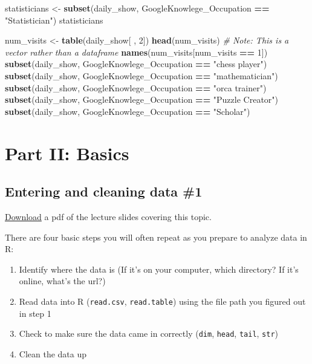 \documentclass[]{book}
\makeatletter
\newenvironment{Shaded}{\begin{snugshade}}{\end{snugshade}}
\newcommand{\KeywordTok}[1]{\textcolor[rgb]{0.13,0.29,0.53}{\textbf{#1}}}
\newcommand{\DecValTok}[1]{\textcolor[rgb]{0.00,0.00,0.81}{#1}}
\newcommand{\StringTok}[1]{\textcolor[rgb]{0.31,0.60,0.02}{#1}}
\newcommand{\CommentTok}[1]{\textcolor[rgb]{0.56,0.35,0.01}{\textit{#1}}}
\newcommand{\OperatorTok}[1]{\textcolor[rgb]{0.81,0.36,0.00}{\textbf{#1}}}
\newcommand{\NormalTok}[1]{#1}
\providecommand{\tightlist}{%
  \setlength{\itemsep}{0pt}\setlength{\parskip}{0pt}}
\newenvironment{kframe}{%
\medskip{}
\setlength{\fboxsep}{.8em}
 \def\at@end@of@kframe{}%
 \ifinner\ifhmode%
  \def\at@end@of@kframe{\end{minipage}}%
  \begin{minipage}{\columnwidth}%
 \fi\fi%
 \def\FrameCommand##1{\hskip\@totalleftmargin \hskip-\fboxsep
 \colorbox{shadecolor}{##1}\hskip-\fboxsep
     \hskip-\linewidth \hskip-\@totalleftmargin \hskip\columnwidth}%
 \MakeFramed {\advance\hsize-\width
   \@totalleftmargin\z@ \linewidth\hsize
   \@setminipage}}%
 {\par\unskip\endMakeFramed%
 \at@end@of@kframe}
\renewenvironment{Shaded}{\begin{kframe}}{\end{kframe}}
\theoremstyle{definition}
\theoremstyle{definition}
\theoremstyle{definition}
\theoremstyle{remark}
\makeatother
\begin{document}
\begin{Shaded}
\begin{Highlighting}[]
\NormalTok{statisticians <-}\StringTok{ }\KeywordTok{subset}\NormalTok{(daily_show,}
\NormalTok{                        GoogleKnowlege_Occupation }\OperatorTok{==}\StringTok{ "Statistician"}\NormalTok{)}
\NormalTok{statisticians}
\end{Highlighting}
\end{Shaded}

\begin{Shaded}
\begin{Highlighting}[]
\NormalTok{num_visits <-}\StringTok{ }\KeywordTok{table}\NormalTok{(daily_show[ , }\DecValTok{2}\NormalTok{])}
\KeywordTok{head}\NormalTok{(num_visits) }\CommentTok{# Note: This is a vector rather than a dataframe}
\KeywordTok{names}\NormalTok{(num_visits[num_visits }\OperatorTok{==}\StringTok{ }\DecValTok{1}\NormalTok{])}
\KeywordTok{subset}\NormalTok{(daily_show, GoogleKnowlege_Occupation }\OperatorTok{==}\StringTok{ "chess player"}\NormalTok{)}
\KeywordTok{subset}\NormalTok{(daily_show, GoogleKnowlege_Occupation }\OperatorTok{==}\StringTok{ "mathematician"}\NormalTok{)}
\KeywordTok{subset}\NormalTok{(daily_show, GoogleKnowlege_Occupation }\OperatorTok{==}\StringTok{ "orca trainer"}\NormalTok{)}
\KeywordTok{subset}\NormalTok{(daily_show, GoogleKnowlege_Occupation }\OperatorTok{==}\StringTok{ "Puzzle Creator"}\NormalTok{)}
\KeywordTok{subset}\NormalTok{(daily_show, GoogleKnowlege_Occupation }\OperatorTok{==}\StringTok{ "Scholar"}\NormalTok{)}
\end{Highlighting}
\end{Shaded}

\part{Part II: Basics}\label{part-part-ii-basics}

\chapter{Entering and cleaning data
\#1}\label{entering-and-cleaning-data-1}

\href{https://github.com/geanders/RProgrammingForResearch/raw/master/slides/CourseNotes_Week2.pdf}{Download}
a pdf of the lecture slides covering this topic.

There are four basic steps you will often repeat as you prepare to
analyze data in R:

\begin{enumerate}
\def\labelenumi{\arabic{enumi}.}
\tightlist
\item
  Identify where the data is (If it's on your computer, which directory?
  If it's online, what's the url?)
\item
  Read data into R (\texttt{read.csv}, \texttt{read.table}) using the
  file path you figured out in step 1
\item
  Check to make sure the data came in correctly (\texttt{dim},
  \texttt{head}, \texttt{tail}, \texttt{str})
\item
  Clean the data up
\end{enumerate}
\end{document}
